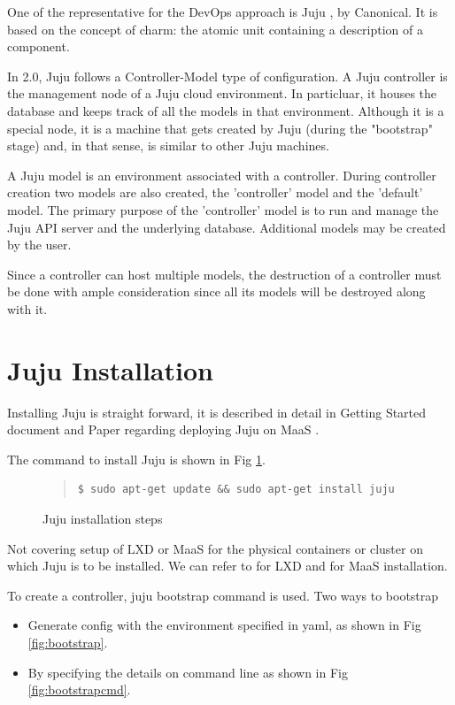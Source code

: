 \documentclass[9pt,twocolumn,twoside]{../../styles/osajnl}
\begin{document}
One of the representative for the DevOps approach is Juju
\cite{www-juju}, by Canonical. It is based on the concept of charm:
the atomic unit containing a description of a component.

In 2.0, Juju follows a Controller-Model type of configuration. A Juju
controller is the management node of a Juju cloud environment. In
particluar\SE, it houses the database and keeps track of all the models
in that environment. Although it is a special node, it is a machine
that gets created by Juju (during the "bootstrap" stage) and, in that
sense, is similar to other Juju machines.

A Juju model is an environment associated with a controller. During
controller creation two models are also created, the 'controller'
model and the 'default' model. The primary purpose of the 'controller'
model is to run and manage the Juju API server and the underlying
database. Additional models may be created by the user.

Since a controller can host multiple models, the destruction of a
controller must be done with ample consideration since all its models
will be destroyed along with it.

\section{Juju Installation}
Installing Juju is straight forward, it is described in detail in
Getting Started document \cite{www-jujucharm-documentation} and Paper
regarding deploying Juju on MaaS \cite{juju-paper}.

The command to install Juju is shown in Fig \ref{fig:juju-install}.
\begin{figure}
  \centering
  \caption{Juju installation steps\cite{www-juju}}\label{fig:juju-install}
  \begin{quote}
    \begin{Verbatim}
$ sudo apt-get update && sudo apt-get install juju
    \end{Verbatim}
  \end{quote}
\end{figure}

Not covering setup of LXD or MaaS for the physical containers or
cluster on which Juju is to be installed. We can refer to
\cite{www-jujucharm-documentation} for LXD and \cite{juju-paper} for
MaaS installation.

To create a controller, juju bootstrap command is used. Two ways to bootstrap
\begin{itemize}
  \item[1.] Generate config with the environment specified in yaml, as
    shown in Fig \ref{fig:bootstrap}.
  \item[2.] By specifying the details on command line as shown in Fig
    \ref{fig:bootstrapcmd}.
\end{itemize}
\end{document}
